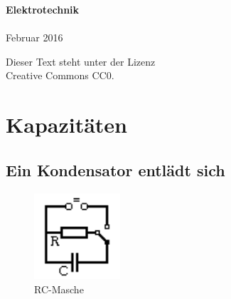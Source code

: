 \documentclass[a4paper,10pt,fleqn,twocolumn,twoside]{scrartcl}
\numberwithin{equation}{section}
\begin{document}

\noindent
\textbf{\sffamily\huge Elektrotechnik}\\
\\
Februar 2016
\vspace{1em}

\noindent
Dieser Text steht unter der Lizenz\\
Creative Commons CC0.


\tableofcontents

\section{Kapazitäten}
\subsection{Ein Kondensator entlädt sich}

\begin{figure}[h]
\centering
\includegraphics[width=32mm]{img/RC.png}
\caption{RC-Masche}
\label{RC}
\end{figure}
\end{document}
